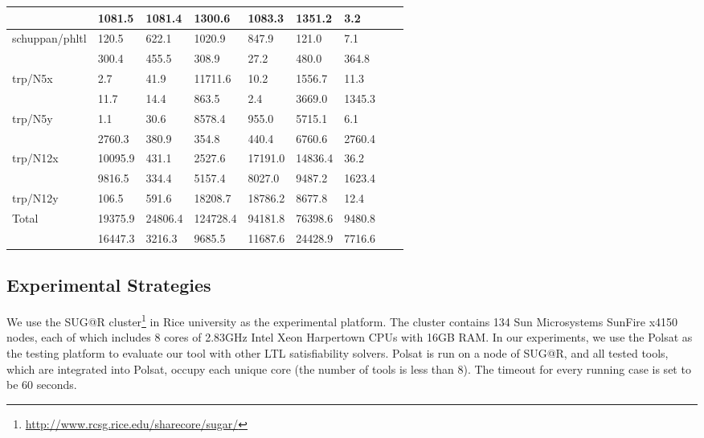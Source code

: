 \documentclass[conference]{IEEEtran}
\begin{document}
\begin{table*}
{\begin{tabular}{|l|l|l|l|l|l|l|l|l|}
  & 1081.5 & 1081.4 & 1300.6 & 1083.3 & 1351.2 & \cellcolor{green!35} 3.2\\
\hline

\multirow{2}{*}{schuppan/phltl}  &  120.5  &  622.1  &  1020.9  &  847.9  &  121.0  & \cellcolor{blue!35} 7.1 \\
 & 300.4  &  455.5  &  308.9  & \cellcolor{green!35} 27.2  &  480.0  &  364.8\\
\hline

\multirow{2}{*}{trp/N5x}  & \cellcolor{blue!35} 2.7  &  41.9  &  11711.6  &  10.2  &  1556.7  &  11.3\\

  & 11.7 & 14.4 & 863.5 & \cellcolor{green!35} 2.4 & 3669.0 & 1345.3\\
\hline
\multirow{2}{*}{trp/N5y}  & \cellcolor{blue!35} 1.1  &  30.6  &  8578.4  &  955.0  &  5715.1  &  6.1\\

  & 2760.3 &   380.9 & \cellcolor{green!35} 354.8 & 440.4 & 6760.6 & 2760.4\\
\hline
\multirow{2}{*}{trp/N12x}  &  10095.9  &  431.1  &  2527.6  &  17191.0  &  14836.4  & \cellcolor{blue!35} 36.2\\

  & 9816.5 & \cellcolor{green!35}334.4 & 5157.4 & 8027.0 & 9487.2 &  1623.4\\
\hline
trp/N12y  &  106.5  &  591.6  &  18208.7  &  18786.2  &  8677.8  & \cellcolor{blue!35} 12.4\\

\hline
\multirow{2}{*}{Total}  &  19375.9  &  24806.4  &  124728.4  &  94181.8  &  76398.6  & \cellcolor{red!35} 9480.8\\

& 16447.3 &  3216.3 & 9685.5 & 11687.6 & 24428.9 & \cellcolor{red!35} 7716.6\\
\hline

\end{tabular}
}

\end{table*}

\subsection{Experimental Strategies}

We use the SUG@R cluster\footnote{\url{http://www.rcsg.rice.edu/sharecore/sugar/}} in Rice university as the experimental
platform. The cluster contains 134 Sun Microsystems SunFire x4150 nodes, each of which includes
8 cores of 2.83GHz Intel Xeon Harpertown CPUs with 16GB RAM. In our experiments, we use the Polsat as the testing platform
\cite{LPZVHCoRR13} to evaluate our tool with other LTL satisfiability solvers. Polsat is run on a node of SUG@R, and all tested tools, which are integrated into Polsat,
occupy each unique core (the number of tools is less than 8). The timeout for every running case is set to be 60 seconds. 
\end{document}
